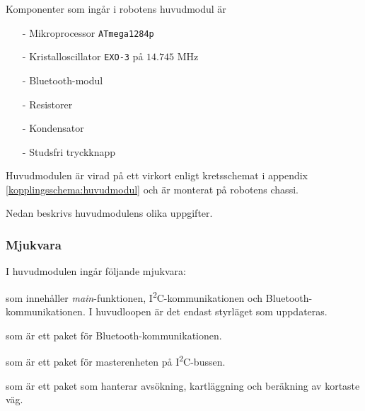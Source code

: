 \documentclass[11pt]{article}
\begin{document}
\begin{flushleft}
Komponenter som ingår i robotens huvudmodul är 
\begin{itemize}
  \item[-] Mikroprocessor \verb+ATmega1284p+
  \item[-] Kristalloscillator \verb+EXO-3+ på $14.745$ MHz
  \item[-] Bluetooth\textsuperscript{\circledR}-modul
  \item[-] Resistorer
  \item[-] Kondensator
  \item[-] Studsfri tryckknapp
\end{itemize}

Huvudmodulen är virad på ett virkort enligt kretsschemat i appendix \ref{kopplingsschema:huvudmodul} och är monterat på robotens chassi. 

Nedan beskrivs huvudmodulens olika uppgifter.

\subsubsection{Mjukvara}
I huvudmodulen ingår följande mjukvara:

\begin{description}[style=unboxed, leftmargin=0cm]
  \item[huvudMain.c] som innehåller \textit{main}-funktionen, I\textsuperscript{2}C-kommunikationen och Bluetooth\textsuperscript{\circledR}-kommunikationen. I huvudloopen är det endast styrläget som uppdateras.
  \item[bluetooth.h] som är ett paket för Bluetooth\textsuperscript{\circledR}-kommunikationen.
  \item[I2C\_master.h] som är ett paket för masterenheten på I\textsuperscript{2}C-bussen.
  \item[searchPath.h] som är ett paket som hanterar avsökning, kartläggning och beräkning av kortaste väg.
\end{description}


\end{flushleft}
\end{document}
